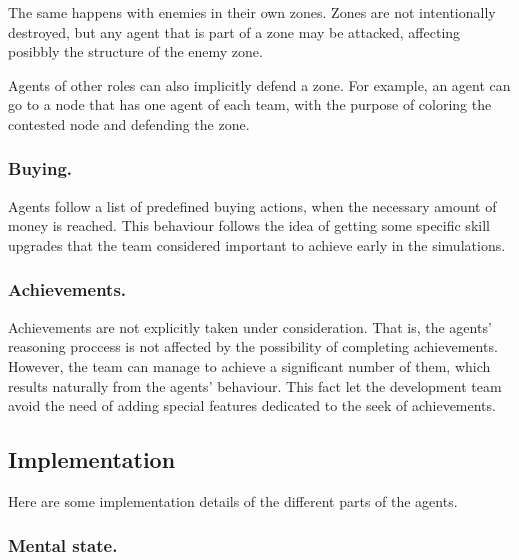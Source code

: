 \documentclass{llncs2e/llncs}
\begin{document}
    The same happens with enemies in their own zones. Zones are not intentionally 
    destroyed, but any agent that is part of a zone may be attacked, affecting 
    posibbly the structure of the enemy zone.
    
    Agents of other roles can also implicitly defend a zone. For example, an agent 
    can go to a node that has one agent of each team, with the purpose of coloring the 
    contested node and defending the zone.

\subsubsection{Buying.}

    Agents follow a list of predefined buying actions, when the necessary amount 
    of money is reached. This behaviour follows the idea of getting some specific skill 
    upgrades that the team considered important to achieve early in the simulations.
    

\subsubsection{Achievements.}

    Achievements are not explicitly taken under consideration. That is, the agents'
    reasoning proccess is not affected by the possibility of completing achievements.    
    However, the team can manage to achieve a significant number of them, which 
    results naturally from the agents' behaviour. 
    This fact let the development team avoid the need of adding special features 
    dedicated to the seek of achievements.
    
\subsection{Implementation}

    Here are some implementation details of the different parts of the agents.
    
\subsubsection{Mental state.}
\end{document}
